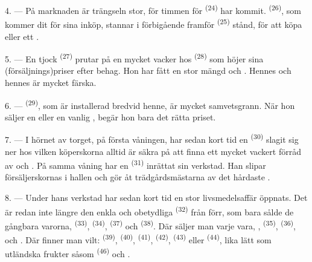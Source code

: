 \VUsaut{4.0mm}
\VUsaut{3.0mm}

4. --- På marknaden är trängseln stor, för timmen för 
\textsuperscript{(24)} har kommit.  \textsuperscript{(26)}, som kommer dit
för sina inköp, stannar i förbigående framför
 \textsuperscript{(25)} stånd, för att köpa
 eller ett .

5. --- En tjock  \textsuperscript{(27)} prutar på en mycket vacker
 hos  \textsuperscript{(28)} som
höjer sina (försäljnings)priser efter behag. Hon har fått en stor mängd
 och . Hennes 
och hennes  är mycket färska.

\VUsaut{4.0mm}
\VUsaut{3.0mm}

6. ---  \textsuperscript{(29)}, som är installerad bredvid henne, är
mycket samvetsgrann. När hon säljer en  eller en vanlig
, begär hon bara det rätta priset.

7. --- I hörnet av torget, på första våningen, har sedan kort tid en
 \textsuperscript{(30)} slagit sig ner hos vilken
köperskorna alltid är säkra på att finna ett mycket vackert förråd av
 och . På samma
våning har en  \textsuperscript{(31)} inrättat sin verkstad. Han slipar
försäljerskornas  i hallen och gör åt trädgårdsmästarna
 av det hårdaste .

\VUsaut{4.0mm}
\VUsaut{3.0mm}

8. --- Under hans verkstad har sedan kort tid en stor livsmedelsaffär öppnats. Det är redan
inte längre den enkla och obetydliga  \textsuperscript{(32)} från förr,
som bara sålde de gångbara varorna,
 \textsuperscript{(33)},  \textsuperscript{(34)},
 \textsuperscript{(37)} och 
\textsuperscript{(38)}. Där säljer man varje vara, ,
 \textsuperscript{(35)}, 
\textsuperscript{(36)},  och
. Där finner man vilt:  \textsuperscript{(39)},
 \textsuperscript{(40)}, 
\textsuperscript{(41)},  \textsuperscript{(42)}, 
\textsuperscript{(43)} eller  \textsuperscript{(44)}, lika lätt som utländska
frukter såsom  \textsuperscript{(46)} och
.


